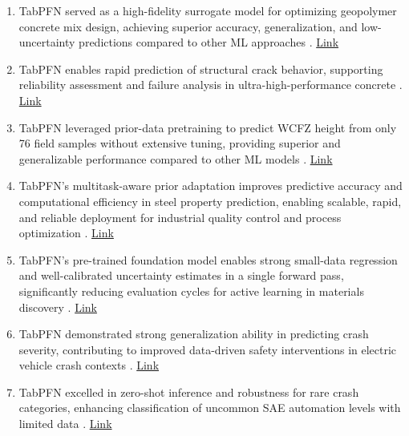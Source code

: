 \begin{enumerate}

\item TabPFN served as a high-fidelity surrogate model for optimizing geopolymer concrete mix design, achieving superior accuracy, generalization, and low-uncertainty predictions compared to other ML approaches \cite{sichani2025machine}. \href{https://www.nature.com/articles/s41598-025-29088-x}{Link}

\item TabPFN enables rapid prediction of structural crack behavior, supporting reliability assessment and failure analysis in ultra-high-performance concrete \cite{mahmoodzadeh2025machine}. \href{https://www.nature.com/articles/s41598-025-23610-x}{Link}

\item TabPFN leveraged prior-data pretraining to predict WCFZ height from only 76 field samples without extensive tuning, providing superior and generalizable performance compared to other ML models \cite{wang2026highfidelity}. \href{https://doi.org/10.1088/2631-8695/ae586d}{Link}

\item TabPFN's multitask-aware prior adaptation improves predictive accuracy and computational efficiency in steel property prediction, enabling scalable, rapid, and reliable deployment for industrial quality control and process optimization \cite{sinodinos2026multitaskinformedpriorincontextlearning}. \href{http://arxiv.org/abs/2603.22738v1}{Link}

\item TabPFN's pre-trained foundation model enables strong small-data regression and well-calibrated uncertainty estimates in a single forward pass, significantly reducing evaluation cycles for active learning in materials discovery \cite{hu2026foundationmodelsurrogatesenabledataefficient}. \href{http://arxiv.org/abs/2603.12567v3}{Link}

\item TabPFN demonstrated strong generalization ability in predicting crash severity, contributing to improved data-driven safety interventions in electric vehicle crash contexts \cite{Somvanshi_2025}. \href{http://arxiv.org/abs/2509.11449v1}{Link}

\item TabPFN excelled in zero-shot inference and robustness for rare crash categories, enhancing classification of uncommon SAE automation levels with limited data \cite{somvanshi2025applyingmambaattentiontabpfntabtransformers}. \href{http://arxiv.org/abs/2506.03160v1}{Link}


\end{enumerate}
